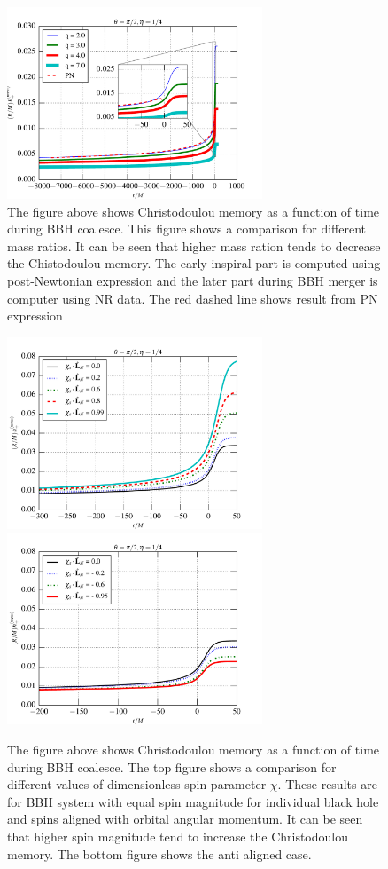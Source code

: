 \documentclass[twocolumn,showpacs,aps,prd,nobibnotes,floatfix]{revtex4-1}
\begin{document}
\begin{figure}
 	\includegraphics[width=3.0in]{../plots/MemoryPlot_nonSpining/q7.pdf}
 	\caption{The figure above shows Christodoulou memory as a function of time during BBH coalesce. This figure shows a comparison for different mass ratios. It can be seen that higher mass ration tends to decrease the Chistodoulou memory. The early inspiral part is computed using post-Newtonian expression and the later part during BBH merger is computer using NR data. The red dashed line shows result from PN expression}
 	\label{fig:differentmassratio}
\end{figure}
\begin{figure}
	\includegraphics[width=3.0in]{../plots/MemoryPlot_AlignedSpinSXSdata/0p99.pdf}
	\includegraphics[width=3.0in]{../plots/MemoryPlot_AntialignedSpinSXSdata/m0p94.pdf}
	\caption{The figure above shows Christodoulou memory as a function of time during BBH coalesce. The top figure shows a comparison for different values of dimensionless spin parameter $\chi$. These results are for BBH system with equal spin magnitude for individual black hole and spins aligned with orbital angular momentum. It can be seen that higher spin magnitude tend to increase the Christodoulou memory. The bottom figure shows the anti aligned case.  }
	\label{fig:differntchivalues}
\end{figure}
\end{document}

